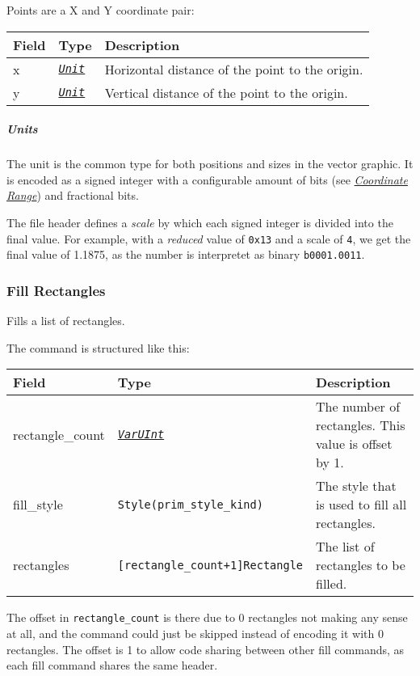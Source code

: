 \documentclass[]{article}
\newcommand{\link}[2]{\hyperlink{#1}{\emph{#2}}}
\begin{document}
Points are a X and Y coordinate pair:

\begin{longtable}[]{@{}p{1in}p{1in}p{4in}@{}}
\toprule
Field & Type & Description \\
\midrule
\endhead
x & \link{units}{\texttt{Unit}} & Horizontal distance of the point to the origin. \\
y & \link{units}{\texttt{Unit}} & Vertical distance of the point to the origin. \\
\bottomrule
\end{longtable}

\hypertarget{units}{\subparagraph{Units}\label{units}}

The unit is the common type for both positions and sizes in the vector
graphic. It is encoded as a signed integer with a configurable amount of
bits (see \link{coordinate-range}{Coordinate Range}) and
fractional bits.

The file header defines a \emph{scale} by which each signed integer is
divided into the final value. For example, with a \emph{reduced} value
of \texttt{0x13} and a scale of \texttt{4}, we get the final value of
1.1875, as the number is interpretet as binary \texttt{b0001.0011}.

\hypertarget{fill-rectangles}{\subsubsection{Fill Rectangles}\label{fill-rectangles}}

Fills a list of rectangles.

The command is structured like this:

\begin{longtable}[]{@{}p{1in}p{2in}p{3in}@{}}
\toprule
Field & Type & Description \\
\midrule
\endhead
rectangle\_count & \link{varuint}{\texttt{VarUInt}}           & The number of rectangles. This value is offset by 1. \\
fill\_style      & \texttt{Style(prim\_style\_kind)}          & The style that is used to fill all rectangles. \\
rectangles       & \texttt{{[}rectangle\_count+1{]}Rectangle} & The list of rectangles to be filled. \\
\bottomrule
\end{longtable}

The offset in \texttt{rectangle\_count} is there due to 0 rectangles not
making any sense at all, and the command could just be skipped instead of
encoding it with 0 rectangles. The offset is 1 to allow code sharing
between other fill commands, as each fill command shares the same
header.
\end{document}

